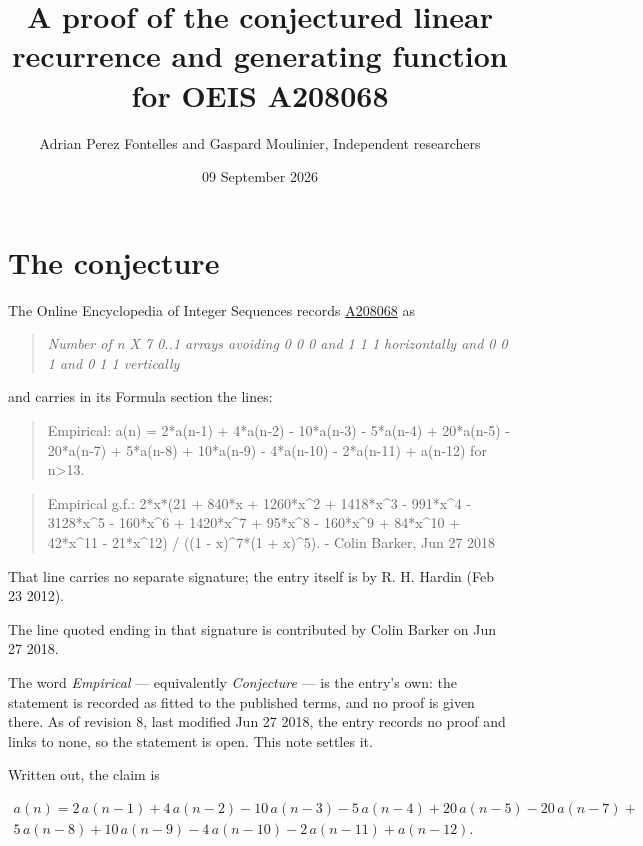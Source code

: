 \documentclass[11pt]{article}
\title{A proof of the conjectured linear recurrence and generating function for OEIS A208068}
\author{Adrian Perez Fontelles and Gaspard Moulinier, Independent researchers}
\date{09 September 2026}
\theoremstyle{definition}
\begin{document}
\maketitle
\section{The conjecture}

The Online Encyclopedia of Integer Sequences records \href{https://oeis.org/A208068}{A208068} as

\begin{quote}\itshape Number of n X 7 0..1 arrays avoiding 0 0 0 and 1 1 1 horizontally and 0 0 1 and 0 1 1 vertically\end{quote}

and carries in its Formula section the lines:

\begin{quote}\ttfamily Empirical: a(n) = 2*a(n-1) + 4*a(n-2) - 10*a(n-3) - 5*a(n-4) + 20*a(n-5) - 20*a(n-7) + 5*a(n-8) + 10*a(n-9) - 4*a(n-10) - 2*a(n-11) + a(n-12) for n>13.\end{quote}

\begin{quote}\ttfamily Empirical g.f.: 2*x*(21 + 840*x + 1260*x\textasciicircum{}2 + 1418*x\textasciicircum{}3 - 991*x\textasciicircum{}4 - 3128*x\textasciicircum{}5 - 160*x\textasciicircum{}6 + 1420*x\textasciicircum{}7 + 95*x\textasciicircum{}8 - 160*x\textasciicircum{}9 + 84*x\textasciicircum{}10 + 42*x\textasciicircum{}11 - 21*x\textasciicircum{}12) / ((1 - x)\textasciicircum{}7*(1 + x)\textasciicircum{}5). - Colin Barker, Jun 27 2018\end{quote}

That line carries no separate signature; the entry itself is by R. H. Hardin (Feb 23 2012).

The line quoted ending in that signature is contributed by Colin Barker on Jun 27 2018.

The word {\itshape Empirical} --- equivalently {\itshape Conjecture} --- is the entry's own: the statement is recorded as fitted to the published terms, and no proof is given there. As of revision 8, last modified Jun 27 2018, the entry records no proof and links to none, so the statement is open. This note settles it.

Written out, the claim is

\begin{multline*} a(n) = 2\,a(n-1) + 4\,a(n-2) - 10\,a(n-3) - 5\,a(n-4) + 20\,a(n-5) - 20\,a(n-7) + \\ 5\,a(n-8) + 10\,a(n-9) - 4\,a(n-10) - 2\,a(n-11) + a(n-12). \end{multline*}
\end{document}

